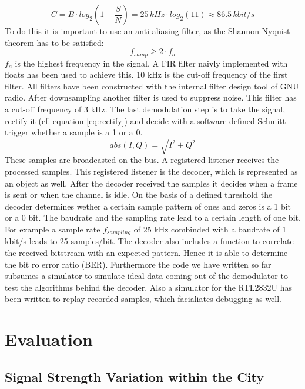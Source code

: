 \documentclass[conference]{IEEEtran}
\begin{document}
\begin{equation}
	\label{eq:awgn}
	C=B \cdot log_2(1+\frac{S}{N})= 25\,kHz \cdot log_2(11) \approx 86.5\,kbit/s
\end{equation}     
To do this it is important to use an anti-aliasing filter, as the Shannon-Nyquist theorem has to be satisfied: 
\begin{equation}
	\label{eq:nyquist}
	f_{samp} \geq 2 \cdot f_{a}
\end{equation}
\ensuremath{f_{a}} is the highest frequency in the signal. 
A FIR filter naivly implemented with floats has been used to achieve this. 10 kHz is the cut-off frequency of the first filter. All filters have been constructed with the internal filter design tool of GNU radio. After downsampling another filter is used to suppress noise. This filter has a cut-off frequency of 3 kHz. The last demodulation step is to take the signal, rectify it (cf. equation \ref{eq:rectify}) and decide with a software-defined Schmitt trigger whether a sample is a 1 or a 0. 
\begin{equation}
	\label{eq:rectify}
	abs(I,Q) = \sqrt{I^2 +  Q^2}
\end{equation} 
These samples are broadcasted on the bus. A registered listener receives the processed samples. This registered listener is the decoder, which is represented as an object as well. After the decoder received the samples it decides when a frame is sent or when the channel is idle. On the basis of a defined threshold the decoder determines wether a certain sample pattern of ones and zeros is a 1 bit or a 0 bit. The baudrate and the sampling rate lead to a certain length of one bit. For example a sample rate \ensuremath{f_{sampling}} of 25 kHz combinded with a baudrate of 1 kbit/s leads to 25 samples/bit. The decoder also includes a function to correlate the received bitstream with an expected pattern. Hence it is able to determine the bit ro error ratio (BER). 
Furthermore the code we have written so far subsumes a simulator to simulate ideal data coming out of the demodulator to test the algorithms behind the decoder. Also a simulator for the RTL2832U has been written to replay recorded samples, which facialiates debugging as well.    
 
\section{Evaluation}

\subsection{Signal Strength Variation within the City}
\end{document}
